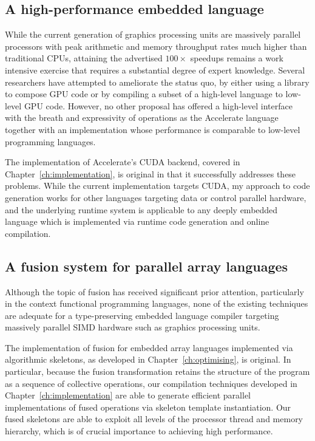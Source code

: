 \subsection{A high-performance embedded language}

While the current generation of graphics processing units are massively parallel
processors with peak arithmetic and memory throughput rates much higher than
traditional CPUs, attaining the advertised $100\times$ speedups remains a work
intensive exercise that requires a substantial degree of expert knowledge.
Several researchers have attempted to ameliorate the status quo, by either using
a library to compose GPU code or by compiling a subset of a high-level language
to low-level GPU code. However, no other proposal has offered a high-level
interface with the breath and expressivity of operations as the Accelerate
language together with an implementation whose performance is comparable to
low-level programming languages.


The implementation of Accelerate's CUDA backend, covered in
Chapter~\ref{ch:implementation}, is original in that it successfully addresses
these problems. While the current implementation targets CUDA, my approach to
code generation works for other languages targeting data or control parallel
hardware, and the underlying runtime system is applicable to any deeply embedded
language which is implemented via runtime code generation and online
compilation.


\subsection{A fusion system for parallel array languages}

Although the topic of fusion has received significant prior attention,
particularly in the context functional programming languages, none of the
existing techniques are adequate for a type-preserving embedded language
compiler targeting massively parallel SIMD hardware such as graphics processing
units.

The implementation of fusion for embedded array languages implemented via
algorithmic skeletons, as developed in Chapter~\ref{ch:optimising}, is original.
In particular, because the fusion transformation retains the structure of the
program as a sequence of collective operations, our compilation techniques
developed in Chapter~\ref{ch:implementation} are able to generate efficient
parallel implementations of fused operations via skeleton template
instantiation. Our fused skeletons are able to exploit all levels of the
processor thread and memory hierarchy, which is of crucial importance to
achieving high performance.


